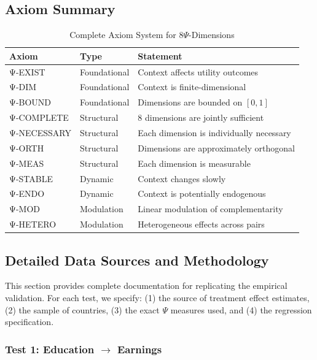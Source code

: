 \subsection{Axiom Summary}

\begin{table}[htbp]
\centering
\caption{Complete Axiom System for 8$\Psi$-Dimensions}
\label{tab:V-axiom-summary}
\small
\renewcommand{\arraystretch}{1.2}
\begin{tabular}{@{}llp{7cm}@{}}
\toprule
\textbf{Axiom} & \textbf{Type} & \textbf{Statement} \\
\midrule
Ψ-EXIST & Foundational & Context affects utility outcomes \\
Ψ-DIM & Foundational & Context is finite-dimensional \\
Ψ-BOUND & Foundational & Dimensions are bounded on $[0,1]$ \\
\midrule
Ψ-COMPLETE & Structural & 8 dimensions are jointly sufficient \\
Ψ-NECESSARY & Structural & Each dimension is individually necessary \\
Ψ-ORTH & Structural & Dimensions are approximately orthogonal \\
Ψ-MEAS & Structural & Each dimension is measurable \\
\midrule
Ψ-STABLE & Dynamic & Context changes slowly \\
Ψ-ENDO & Dynamic & Context is potentially endogenous \\
\midrule
Ψ-MOD & Modulation & Linear modulation of complementarity \\
Ψ-HETERO & Modulation & Heterogeneous effects across pairs \\
\bottomrule
\end{tabular}
\end{table}



\subsection{Detailed Data Sources and Methodology}
\label{sec:psi-data-details}

This section provides complete documentation for replicating the empirical validation. For each test, we specify: (1) the source of treatment effect estimates, (2) the sample of countries, (3) the exact $\Psi$ measures used, and (4) the regression specification.

\subsubsection{Test 1: Education $\rightarrow$ Earnings}

